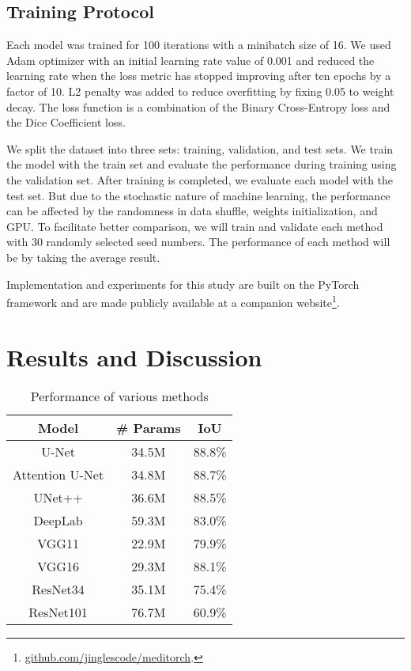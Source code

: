 \documentclass[conference]{IEEEtran}
\begin{document}
\subsection{Training Protocol}

Each model was trained for 100 iterations with a minibatch size of 16. We used Adam optimizer with an initial learning rate value of 0.001 and reduced the learning rate when the loss metric has stopped improving after ten epochs by a factor of 10. L2 penalty was added to reduce overfitting by fixing 0.05 to weight decay. The loss function is a combination of the Binary Cross-Entropy loss and the Dice Coefficient loss. 

We split the dataset into three sets: training, validation, and test sets. We train the model with the train set and evaluate the performance during training using the validation set. After training is completed, we evaluate each model with the test set. But due to the stochastic nature of machine learning, the performance can be affected by the randomness in data shuffle, weights initialization, and GPU. To facilitate better comparison, we will train and validate each method with 30 randomly selected seed numbers. The performance of each method will be by taking the average result.

Implementation and experiments for this study are built on the PyTorch framework and are made publicly available at a companion website\footnote{\href{https://github.com/jinglescode/meditorch/blob/master/demo/Nucleus-compare.ipynb}{github.com/jinglescode/meditorch}.}.

\section{Results and Discussion}

\begin{table}[t]
\centering
\caption{Performance of various methods}
\begin{tabular}{||c|c|c||}
\hline
\textbf{Model} & \textbf{\# Params} & \textbf{IoU} \\
\hline
U-Net & 34.5M & 88.8\% \\
Attention U-Net & 34.8M & 88.7\% \\
UNet++ & 36.6M & 88.5\% \\
DeepLab & 59.3M & 83.0\% \\
VGG11 & 22.9M & 79.9\% \\
VGG16 & 29.3M & 88.1\% \\
ResNet34 & 35.1M & 75.4\% \\
ResNet101 & 76.7M & 60.9\% \\
\hline
\end{tabular}
\label{table_results}
\end{table}
\end{document}
